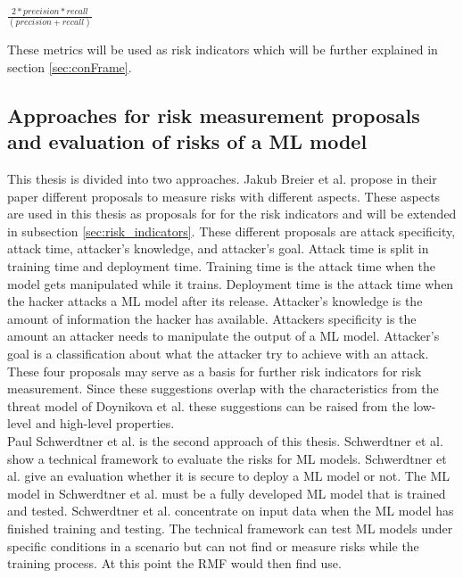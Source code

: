 \begin{center}
  $\frac{2 * precision * recall}{(precision + recall)}$
\end{center}

These metrics will be used as risk indicators which will be further explained in section \ref{sec:conFrame}.

\subsection{Approaches for risk measurement proposals and evaluation of risks of a ML model}
\label{sec:approaches}

This thesis is divided into two approaches. Jakub Breier et al. \cite{DBLP:journals/corr/abs-2012-04884} propose in their paper different proposals to measure risks with different
aspects. These aspects are used in this thesis as proposals for for the risk indicators and will be extended in subsection \ref{sec:risk_indicators}. These different proposals are attack specificity, attack time, attacker's knowledge, and attacker's goal. Attack time is split in training time and deployment time. Training time is the attack time when the model gets manipulated while it trains. Deployment time is the attack time when the hacker attacks a
ML model after its release. Attacker's knowledge is the amount of information the hacker has available. Attackers specificity is the amount an attacker needs to manipulate the output of a
ML model. Attacker's goal is a classification about what the attacker try to achieve with an attack. These four proposals may serve as a basis for further risk indicators for risk measurement. Since these suggestions overlap with the characteristics from the threat model of Doynikova et al. these suggestions can be raised from the low-level and high-level properties.\\
Paul Schwerdtner et al. \cite{DBLP:journals/corr/abs-2011-04328} is the second approach of this thesis. Schwerdtner et al. show a technical framework to evaluate the risks for ML models.
Schwerdtner et al. give an evaluation whether it is secure to deploy a ML model or not. The ML model in Schwerdtner et al. must be a fully developed ML model that is trained and tested.
Schwerdtner et al. concentrate on input data when the ML model has finished training and testing. The technical framework can test ML models under specific conditions in a scenario but can not find or measure risks while the training process. At this point the RMF would then find use.\\
